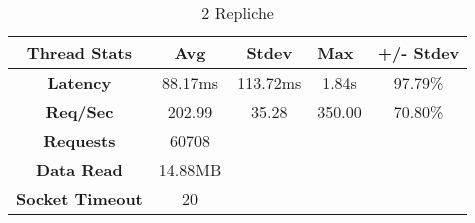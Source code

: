 \begin{table}[H]
\caption{2 Repliche}
\centering
\begin{tabular}{|c|c|ccc}
\hline
\textbf{Thread Stats}   & \textbf{Avg} & \multicolumn{1}{c|}{\textbf{Stdev}} & \multicolumn{1}{l|}{\textbf{Max}} & \multicolumn{1}{l|}{\textbf{+/- Stdev}} \\ \hline
\textbf{Latency}        & 88.17ms      & \multicolumn{1}{c|}{113.72ms}       & \multicolumn{1}{c|}{1.84s}        & \multicolumn{1}{c|}{97.79\%}            \\ \hline
\textbf{Req/Sec}        & 202.99       & \multicolumn{1}{c|}{35.28}          & \multicolumn{1}{c|}{350.00}       & \multicolumn{1}{c|}{70.80\%}            \\ \hline
\textbf{Requests}       & 60708        &                                     &                                   &                                         \\ \cline{1-2}
\textbf{Data Read}      & 14.88MB      &                                     &                                   &                                         \\ \cline{1-2}
\textbf{Socket Timeout} & 20           &                                     &                                   &                                         \\ \cline{1-2}
\end{tabular}
\end{table}
